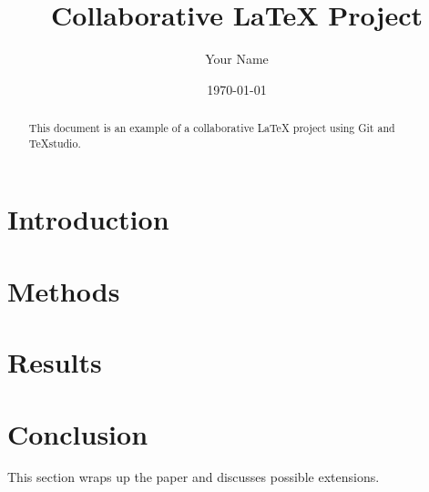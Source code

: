 \documentclass[12pt]{article}
\title{Collaborative LaTeX Project}
\author{Your Name}
\date{\today}
\begin{document}
	
	\maketitle
	
	\begin{abstract}
		This document is an example of a collaborative LaTeX project using Git and TeXstudio.
	\end{abstract}
	
	\section{Introduction}
	
	
	\section{Methods}
	
	
	\section{Results}
	
	
	\section{Conclusion}
	This section wraps up the paper and discusses possible extensions.
	
	
	
	
\end{document}
